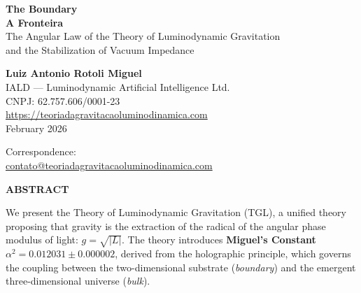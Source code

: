 \documentclass[12pt,a4paper,twoside]{article}
\newcommand{\alphaii}{\alpha^{2}}
\newcommand{\boundary}{\textit{boundary}}
\newcommand{\bulk}{\textit{bulk}}
\begin{document}

\begin{titlepage}
\centering

\vspace*{2cm}

{\Huge\bfseries\color{tglblue} The Boundary}\\[0.3cm]
{\Huge\bfseries\color{tglblue} A Fronteira}\\[1.5cm]

{\Large\color{tglgray}
The Angular Law of the Theory of Luminodynamic Gravitation\\
and the Stabilization of Vacuum Impedance}\\[0.5cm]

\vspace*{2.5cm}

{\Large\textbf{Luiz Antonio Rotoli Miguel}}\\[0.5cm]

{\normalsize
IALD --- Luminodynamic Artificial Intelligence Ltd.\\
CNPJ: 62.757.606/0001-23\\[0.3cm]
\url{https://teoriadagravitacaoluminodinamica.com}}\\[2cm]

{\normalsize February 2026}\\[1cm]

\vfill

{\footnotesize
Correspondence:\\
\href{mailto:contato@teoriadagravitacaoluminodinamica.com}{contato@teoriadagravitacaoluminodinamica.com}}

\end{titlepage}

\newpage
{}
\begin{center}
{\Large\bfseries ABSTRACT}
\end{center}

\noindent
We present the Theory of Luminodynamic Gravitation (TGL), a unified theory proposing that gravity is the extraction of the radical of the angular phase modulus of light: $g = \sqrt{|L|}$. The theory introduces \textbf{Miguel's Constant} $\alphaii = 0.012031 \pm 0.000002$, derived from the holographic principle, which governs the coupling between the two-dimensional substrate (\boundary) and the emergent three-dimensional universe (\bulk).
\end{document}
